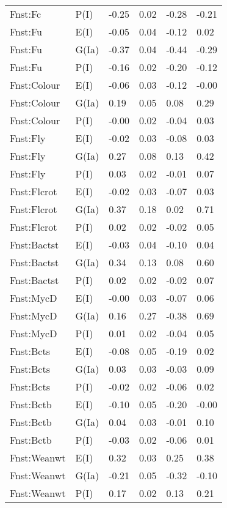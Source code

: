 \begin{center}
\begin{longtable}{|p{1.1in}|p{0.7in}|p{0.7in}|p{0.6in}|p{0.6in}|p{0.6in}|}
  Fnst:Fc & P(I) & -0.25 & 0.02 & -0.28 & -0.21 \\ 
  Fnst:Fu & E(I) & -0.05 & 0.04 & -0.12 & 0.02 \\ 
  Fnst:Fu & G(Ia) & -0.37 & 0.04 & -0.44 & -0.29 \\ 
  Fnst:Fu & P(I) & -0.16 & 0.02 & -0.20 & -0.12 \\ 
  Fnst:Colour & E(I) & -0.06 & 0.03 & -0.12 & -0.00 \\ 
  Fnst:Colour & G(Ia) & 0.19 & 0.05 & 0.08 & 0.29 \\ 
  Fnst:Colour & P(I) & -0.00 & 0.02 & -0.04 & 0.03 \\ 
  Fnst:Fly & E(I) & -0.02 & 0.03 & -0.08 & 0.03 \\ 
  Fnst:Fly & G(Ia) & 0.27 & 0.08 & 0.13 & 0.42 \\ 
  Fnst:Fly & P(I) & 0.03 & 0.02 & -0.01 & 0.07 \\ 
  Fnst:Flcrot & E(I) & -0.02 & 0.03 & -0.07 & 0.03 \\ 
  Fnst:Flcrot & G(Ia) & 0.37 & 0.18 & 0.02 & 0.71 \\ 
  Fnst:Flcrot & P(I) & 0.02 & 0.02 & -0.02 & 0.05 \\ 
  Fnst:Bactst & E(I) & -0.03 & 0.04 & -0.10 & 0.04 \\ 
  Fnst:Bactst & G(Ia) & 0.34 & 0.13 & 0.08 & 0.60 \\ 
  Fnst:Bactst & P(I) & 0.02 & 0.02 & -0.02 & 0.07 \\ 
  Fnst:MycD & E(I) & -0.00 & 0.03 & -0.07 & 0.06 \\ 
  Fnst:MycD & G(Ia) & 0.16 & 0.27 & -0.38 & 0.69 \\ 
  Fnst:MycD & P(I) & 0.01 & 0.02 & -0.04 & 0.05 \\ 
  Fnst:Bcts & E(I) & -0.08 & 0.05 & -0.19 & 0.02 \\ 
  Fnst:Bcts & G(Ia) & 0.03 & 0.03 & -0.03 & 0.09 \\ 
  Fnst:Bcts & P(I) & -0.02 & 0.02 & -0.06 & 0.02 \\ 
  Fnst:Bctb & E(I) & -0.10 & 0.05 & -0.20 & -0.00 \\ 
  Fnst:Bctb & G(Ia) & 0.04 & 0.03 & -0.01 & 0.10 \\ 
  Fnst:Bctb & P(I) & -0.03 & 0.02 & -0.06 & 0.01 \\ 
  Fnst:Weanwt & E(I) & 0.32 & 0.03 & 0.25 & 0.38 \\ 
  Fnst:Weanwt & G(Ia) & -0.21 & 0.05 & -0.32 & -0.10 \\ 
  Fnst:Weanwt & P(I) & 0.17 & 0.02 & 0.13 & 0.21 \\ 

\end{longtable}
\end{center}
